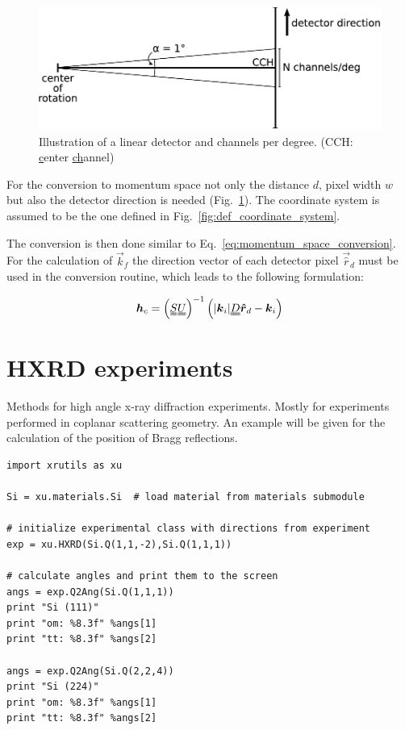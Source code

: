 \begin{figure}[H]
 \centering
 \includegraphics[width=0.6\linewidth]{pics/linear_detector_chpdeg}
 \caption{Illustration of a linear detector and channels per degree. (CCH: \underline{c}enter \underline{ch}annel)}
 \label{fig:detector_chpdeg}
\end{figure}

For the conversion to momentum space not only the distance $d$, pixel width $w$ but also the detector direction is needed (Fig.~\ref{fig:detector_chpdeg}). The coordinate system is assumed to be the one defined in Fig.~\ref{fig:def_coordinate_system}.

The conversion is then done similar to Eq.~\ref{eq:momentum_space_conversion}. For the calculation of $\vec k_f$ the direction vector of each detector pixel $\vec{\hat r}_d$ must be used in the conversion routine, which leads to the following formulation:

\begin{align}
\vec h_c = \left( \mat S \mat U \right)^{-1} \left(|\vec k_i| \mat D \vec{\hat r}_d - \vec k_i  \right)  
 \label{eq:momentum_space_conversion_detector}
\end{align}


\section{HXRD experiments}

Methods for high angle x-ray diffraction experiments. Mostly for experiments performed in coplanar scattering geometry. An example will be given for the calculation of the position of Bragg reflections.

\begin{lstlisting}[caption=calculation of angles for Si Bragg reflections]
import xrutils as xu

Si = xu.materials.Si  # load material from materials submodule

# initialize experimental class with directions from experiment
exp = xu.HXRD(Si.Q(1,1,-2),Si.Q(1,1,1))

# calculate angles and print them to the screen
angs = exp.Q2Ang(Si.Q(1,1,1))
print "Si (111)"
print "om: %8.3f" %angs[1] 
print "tt: %8.3f" %angs[2]

angs = exp.Q2Ang(Si.Q(2,2,4))
print "Si (224)"
print "om: %8.3f" %angs[1] 
print "tt: %8.3f" %angs[2]
\end{lstlisting}


